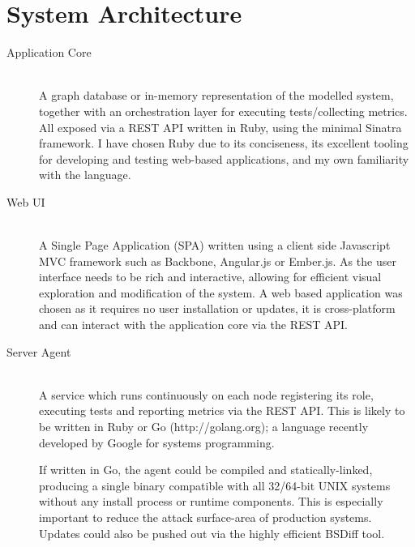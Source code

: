 \documentclass{cshonours}
\begin{document}
\section{System Architecture}
\label{section:architecture}

\begin{description}
  \item [Application Core]\hfill \\
    A graph database or in-memory representation of the modelled system, together with an orchestration layer for executing tests/collecting metrics. All exposed via a REST API written in Ruby, using the minimal Sinatra framework. I have chosen Ruby due to its conciseness, its excellent tooling for developing and testing web-based applications, and my own familiarity with the language.
  \item [Web UI]\hfill \\
    A Single Page Application (SPA) written using a client side Javascript MVC framework such as Backbone, Angular.js or Ember.js. As the user interface needs to be rich and interactive, allowing for efficient visual exploration and modification of the system. A web based application was chosen as it requires no user installation or updates, it is cross-platform and can interact with the application core via the REST API.
  \item [Server Agent]\hfill \\
    A service which runs continuously on each node registering its role, executing tests and reporting metrics via the REST API. This is likely to be written in Ruby or Go (http://golang.org); a language recently developed by Google for systems programming.

    If written in Go, the agent could be compiled and statically-linked, producing a single binary compatible with all 32/64-bit UNIX systems without any install process or runtime components. This is especially important to reduce the attack surface-area of production systems. Updates could also be pushed out via the highly efficient BSDiff tool.
\end{description}

\pagebreak
\end{document}

